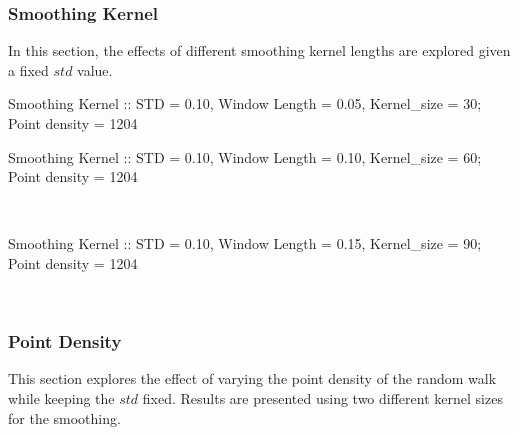 \documentclass[AMA,LATO1COL]{WileyNJD-v2}
\begin{document}
\subsubsection{Smoothing Kernel}\label{reswater:smoothing-kernel}\raggedright
In this section, the effects of different smoothing kernel lengths are explored given a fixed $std$ value.

\begin{center}
Smoothing Kernel :: STD = 0.10, Window Length = 0.05, Kernel\_size = 30; Point density = 1204


    \begin{center}
    \end{center}

    
    \newpage 
Smoothing Kernel :: STD = 0.10, Window Length = 0.10, Kernel\_size = 60; Point density = 1204


    \begin{center}
    \end{center}
    { \hspace*{\fill} \\}
    
    \newpage 
Smoothing Kernel :: STD = 0.10, Window Length = 0.15, Kernel\_size = 90; Point density = 1204



    \begin{center}
    \end{center}
    { \hspace*{\fill} \\}
\end{center}

\subsubsection{Point Density}\label{reswater:point-density}\raggedright
This section explores the effect of varying the point density of the random walk while keeping the \(std\) fixed. Results are presented using two different kernel sizes for the smoothing.
\end{document}
